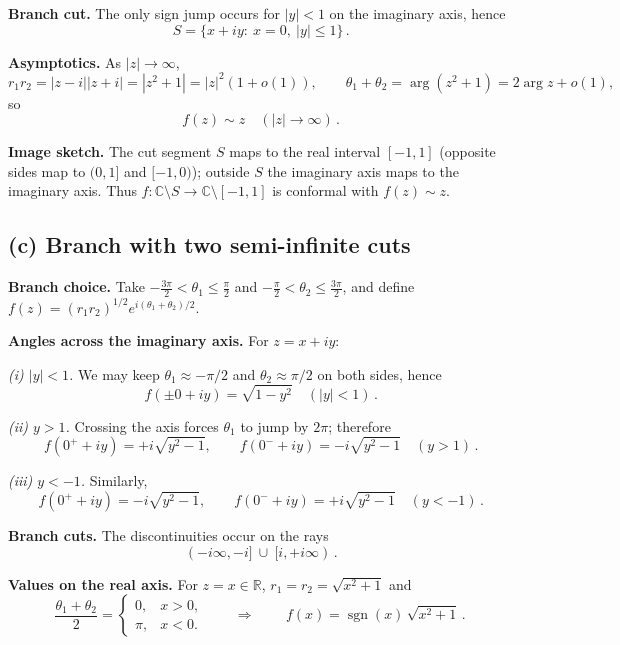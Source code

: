 \documentclass[11pt]{article}
\begin{document}
	\textbf{Branch cut.}
	The only sign jump occurs for \(|y|<1\) on the imaginary axis, hence
	\[
	\boxed{\,S=\{x+iy:\ x=0,\ |y|\le 1\}\, }.
	\]
	
	\textbf{Asymptotics.}
	As \(|z|\to\infty\),
	\[
	r_{1}r_{2}=|z-i||z+i|=|z^{2}+1|=|z|^{2}(1+o(1)),\qquad
	\theta_{1}+\theta_{2}=\arg(z^{2}+1)=2\arg z+o(1),
	\]
	so
	\[
	\boxed{\,f(z)\sim z\quad (|z|\to\infty)\, }.
	\]
	
	\textbf{Image sketch.}
	The cut segment \(S\) maps to the real interval \([-1,1]\) (opposite sides map to \((0,1]\) and \([-1,0)\));
	outside \(S\) the imaginary axis maps to the imaginary axis. Thus \(f:\mathbb C\setminus S\to\mathbb C\setminus[-1,1]\) is conformal with \(f(z)\sim z\).
	
	\subsection*{(c) Branch with two semi-infinite cuts}
	
	\textbf{Branch choice.}
	Take \(-\frac{3\pi}{2}<\theta_{1}\le \frac{\pi}{2}\) and \(-\frac{\pi}{2}<\theta_{2}\le \frac{3\pi}{2}\),
	and define \(f(z)=(r_{1}r_{2})^{1/2}e^{i(\theta_{1}+\theta_{2})/2}\).
	
	\textbf{Angles across the imaginary axis.}
	For \(z=x+iy\):
	
	\emph{(i) \(|y|<1\).}
	We may keep \(\theta_{1}\approx -\pi/2\) and \(\theta_{2}\approx \pi/2\) on both sides, hence
	\[
	\boxed{\,f(\pm 0+iy)=\sqrt{1-y^{2}}\quad(|y|<1)\, }.
	\]
	
	\emph{(ii) \(y>1\).}
	Crossing the axis forces \(\theta_{1}\) to jump by \(2\pi\); therefore
	\[
	\boxed{\,f(0^{+}+iy)=+i\sqrt{y^{2}-1},\qquad f(0^{-}+iy)=-i\sqrt{y^{2}-1}\quad(y>1)\, }.
	\]
	
	\emph{(iii) \(y<-1\).}
	Similarly,
	\[
	\boxed{\,f(0^{+}+iy)=-i\sqrt{y^{2}-1},\qquad f(0^{-}+iy)=+i\sqrt{y^{2}-1}\quad(y<-1)\, }.
	\]
	
	\textbf{Branch cuts.}
	The discontinuities occur on the rays
	\[
	\boxed{\,(-i\infty,-i]\ \cup\ [i,+i\infty)\, }.
	\]
	
	\textbf{Values on the real axis.}
	For \(z=x\in\mathbb R\), \(r_{1}=r_{2}=\sqrt{x^{2}+1}\) and
	\[
	\frac{\theta_{1}+\theta_{2}}{2}=
	\begin{cases}
		0,& x>0,\\
		\pi,& x<0.
	\end{cases}
	\qquad\Rightarrow\qquad
	\boxed{\,f(x)=\operatorname{sgn}(x)\,\sqrt{x^{2}+1}\, }.
	\]
	
\end{document}
